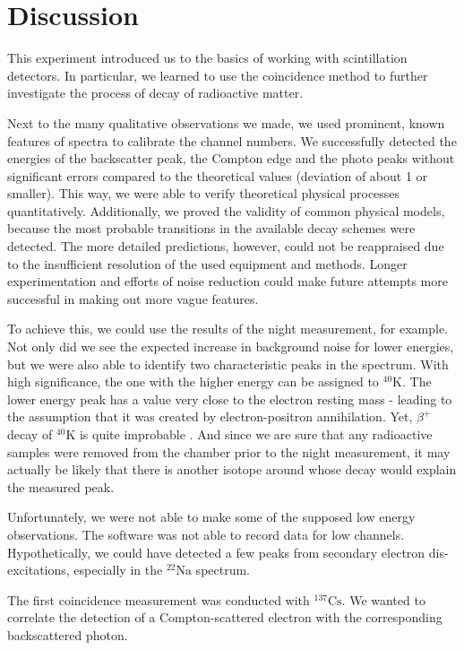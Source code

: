 \section{Discussion}
%
This experiment introduced us to the basics of working with scintillation detectors.
In particular, we learned to use the coincidence method to further investigate the process of decay of radioactive matter.
%
\par
%
Next to the many qualitative observations we made, we used prominent, known features of spectra to calibrate the channel numbers.
We successfully detected the energies of the backscatter peak, the Compton edge and the photo peaks without significant errors compared to the theoretical values (deviation of about \SI{1}{\sigma} or smaller).
This way, we were able to verify theoretical physical processes quantitatively.
Additionally, we proved the validity of common physical models, because the most probable transitions in the available decay schemes were detected.
The more detailed predictions, however, could not be reappraised due to the insufficient resolution of the used equipment and methods.
Longer experimentation and efforts of noise reduction could make future attempts more successful in making out more vague features.
%
\par
%
To achieve this, we could use the results of the night measurement, for example.
Not only did we see the expected increase in background noise for lower energies, but we were also able to identify two characteristic peaks in the spectrum.
With high significance, the one with the higher energy can be assigned to $^{40}\text{K}$.
The lower energy peak has a value very close to the electron resting mass - leading to the assumption that it was created by electron-positron annihilation.
Yet, $\beta^{+}$ decay of $^{40}\text{K}$ is quite improbable \cite{WikiPotassium}.
And since we are sure that any radioactive samples were removed from the chamber prior to the night measurement, it may actually be likely that there is another isotope around whose decay would explain the measured peak.
%
\par
%
Unfortunately, we were not able to make some of the supposed low energy observations.
The software was not able to record data for low channels.
Hypothetically, we could have detected a few peaks from secondary electron dis-excitations, especially in the $^{22}\text{Na}$ spectrum.
%
\par
%
The first coincidence measurement was conducted with $^{137}\text{Cs}$.
We wanted to correlate the detection of a Compton-scattered electron with the corresponding backscattered photon.
